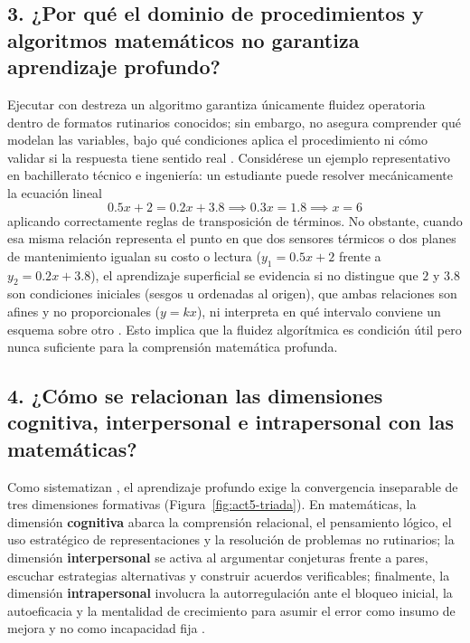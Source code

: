 \documentclass[spanish,letterpaper,oneside]{article}
\begin{document}
\subsection*{3. ¿Por qué el dominio de procedimientos y algoritmos matemáticos no garantiza aprendizaje profundo?}
Ejecutar con destreza un algoritmo garantiza únicamente fluidez operatoria dentro de formatos rutinarios conocidos; sin embargo, no asegura comprender qué modelan las variables, bajo qué condiciones aplica el procedimiento ni cómo validar si la respuesta tiene sentido real \citep{sawyer2008optimizing}. Considérese un ejemplo representativo en bachillerato técnico e ingeniería: un estudiante puede resolver mecánicamente la ecuación lineal
\[
0.5x + 2 = 0.2x + 3.8 \implies 0.3x = 1.8 \implies x = 6
\]
aplicando correctamente reglas de transposición de términos. No obstante, cuando esa misma relación representa el punto en que dos sensores térmicos o dos planes de mantenimiento igualan su costo o lectura ($y_1 = 0.5x + 2$ frente a $y_2 = 0.2x + 3.8$), el aprendizaje superficial se evidencia si no distingue que $2$ y $3.8$ son condiciones iniciales (sesgos u ordenadas al origen), que ambas relaciones son afines y no proporcionales ($y=kx$), ni interpreta en qué intervalo conviene un esquema sobre otro \citep{conalep2025mecatronica}. Esto implica que la fluidez algorítmica es condición útil pero nunca suficiente para la comprensión matemática profunda.

\subsection*{4. ¿Cómo se relacionan las dimensiones cognitiva, interpersonal e intrapersonal con las matemáticas?}
Como sistematizan \citet{quiroga2022aprendizaje}, el aprendizaje profundo exige la convergencia inseparable de tres dimensiones formativas (Figura~\ref{fig:act5-triada}). En matemáticas, la dimensión \textbf{cognitiva} abarca la comprensión relacional, el pensamiento lógico, el uso estratégico de representaciones y la resolución de problemas no rutinarios; la dimensión \textbf{interpersonal} se activa al argumentar conjeturas frente a pares, escuchar estrategias alternativas y construir acuerdos verificables; finalmente, la dimensión \textbf{intrapersonal} involucra la autorregulación ante el bloqueo inicial, la autoeficacia y la mentalidad de crecimiento para asumir el error como insumo de mejora y no como incapacidad fija \citep{schunk2012teorias}.
\end{document}
